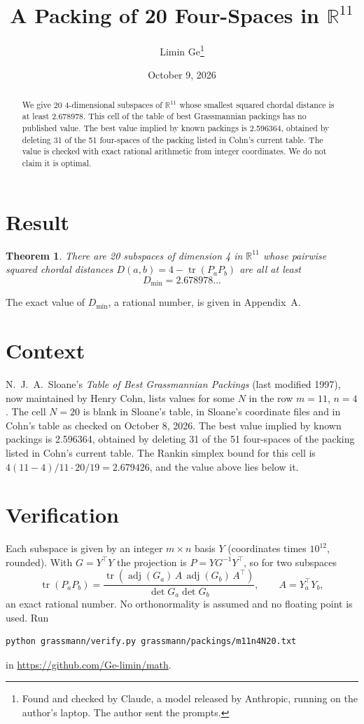 \documentclass[11pt,a4paper]{article}
\title{A Packing of 20 Four-Spaces in $\mathbb{R}^{11}$}
\author{Limin Ge\thanks{Found and checked by Claude, a model released by Anthropic, running on the author's laptop. The author sent the prompts.}}
\date{October 9, 2026}
\newtheorem*{theorem}{Theorem}
\begin{document}
\maketitle
\begin{abstract}
We give 20 4-dimensional subspaces of $\mathbb{R}^{11}$ whose smallest squared chordal distance is at least 2.678978. This cell of the table of best Grassmannian packings has no published value. The best value implied by known packings is 2.596364, obtained by deleting 31 of the 51 four-spaces of the packing listed in Cohn's current table. The value is checked with exact rational arithmetic from integer coordinates. We do not claim it is optimal.
\end{abstract}

\section{Result}
\begin{theorem}
There are 20 subspaces of dimension 4 in $\mathbb{R}^{11}$ whose pairwise squared chordal distances $D(a,b) = 4 - \operatorname{tr}(P_aP_b)$ are all at least
\[ D_{\min} = 2.678978\ldots \]
\end{theorem}
The exact value of $D_{\min}$, a rational number, is given in Appendix~A.


\section{Context}
N.~J.~A.~Sloane's \emph{Table of Best Grassmannian Packings} (last modified 1997), now maintained by Henry Cohn, lists values for some $N$ in the row $m=11$, $n=4$. The cell $N=20$ is blank in Sloane's table, in Sloane's coordinate files and in Cohn's table as checked on October 8, 2026. The best value implied by known packings is 2.596364, obtained by deleting 31 of the 51 four-spaces of the packing listed in Cohn's current table. The Rankin simplex bound for this cell is $4(11-4)/11\cdot 20/19 = 2.679426$, and the value above lies below it.


\section{Verification}
Each subspace is given by an integer $m\times n$ basis $Y$ (coordinates times $10^{12}$, rounded). With $G=Y^\top Y$ the projection is $P=YG^{-1}Y^\top$, so for two subspaces
\[ \operatorname{tr}(P_aP_b)=\frac{\operatorname{tr}(\operatorname{adj}(G_a)\,A\,\operatorname{adj}(G_b)\,A^\top)}{\det G_a\det G_b},\qquad A=Y_a^\top Y_b, \]
an exact rational number. No orthonormality is assumed and no floating point is used. Run
\begin{verbatim}
python grassmann/verify.py grassmann/packings/m11n4N20.txt
\end{verbatim}
in \url{https://github.com/Ge-limin/math}.
\end{document}
